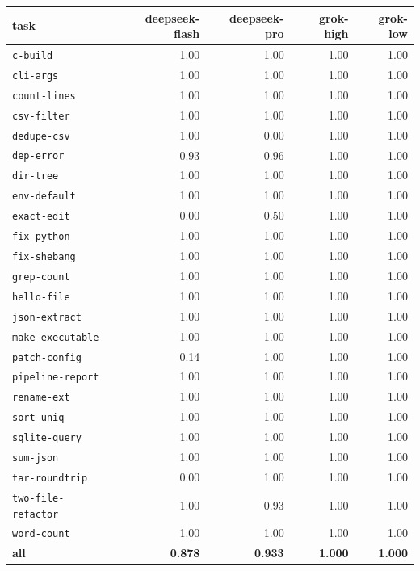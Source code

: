 \begin{tabular}{lrrrr}
\toprule
task & deepseek-flash & deepseek-pro & grok-high & grok-low \\
\midrule
\texttt{c-build} & 1.00 & 1.00 & 1.00 & 1.00 \\
\texttt{cli-args} & 1.00 & 1.00 & 1.00 & 1.00 \\
\texttt{count-lines} & 1.00 & 1.00 & 1.00 & 1.00 \\
\texttt{csv-filter} & 1.00 & 1.00 & 1.00 & 1.00 \\
\texttt{dedupe-csv} & 1.00 & 0.00 & 1.00 & 1.00 \\
\texttt{dep-error} & 0.93 & 0.96 & 1.00 & 1.00 \\
\texttt{dir-tree} & 1.00 & 1.00 & 1.00 & 1.00 \\
\texttt{env-default} & 1.00 & 1.00 & 1.00 & 1.00 \\
\texttt{exact-edit} & 0.00 & 0.50 & 1.00 & 1.00 \\
\texttt{fix-python} & 1.00 & 1.00 & 1.00 & 1.00 \\
\texttt{fix-shebang} & 1.00 & 1.00 & 1.00 & 1.00 \\
\texttt{grep-count} & 1.00 & 1.00 & 1.00 & 1.00 \\
\texttt{hello-file} & 1.00 & 1.00 & 1.00 & 1.00 \\
\texttt{json-extract} & 1.00 & 1.00 & 1.00 & 1.00 \\
\texttt{make-executable} & 1.00 & 1.00 & 1.00 & 1.00 \\
\texttt{patch-config} & 0.14 & 1.00 & 1.00 & 1.00 \\
\texttt{pipeline-report} & 1.00 & 1.00 & 1.00 & 1.00 \\
\texttt{rename-ext} & 1.00 & 1.00 & 1.00 & 1.00 \\
\texttt{sort-uniq} & 1.00 & 1.00 & 1.00 & 1.00 \\
\texttt{sqlite-query} & 1.00 & 1.00 & 1.00 & 1.00 \\
\texttt{sum-json} & 1.00 & 1.00 & 1.00 & 1.00 \\
\texttt{tar-roundtrip} & 0.00 & 1.00 & 1.00 & 1.00 \\
\texttt{two-file-refactor} & 1.00 & 0.93 & 1.00 & 1.00 \\
\texttt{word-count} & 1.00 & 1.00 & 1.00 & 1.00 \\
\textbf{all} & \textbf{0.878} & \textbf{0.933} & \textbf{1.000} & \textbf{1.000} \\
\bottomrule
\end{tabular}
